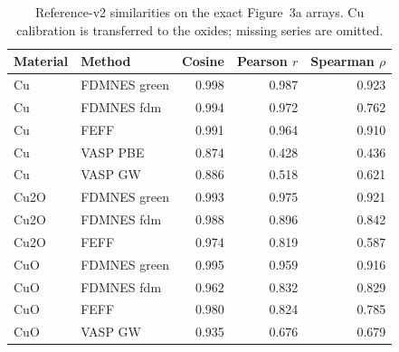 \begin{table}[htbp]\centering\small
\caption{Reference-v2 similarities on the exact Figure~3a arrays. Cu calibration is transferred to the oxides; missing series are omitted.}\label{tab:similarity}
\begin{tabular}{llrrr}\toprule Material & Method & Cosine & Pearson $r$ & Spearman $\rho$\\\midrule
Cu & FDMNES green & 0.998 & 0.987 & 0.923\\
Cu & FDMNES fdm & 0.994 & 0.972 & 0.762\\
Cu & FEFF & 0.991 & 0.964 & 0.910\\
Cu & VASP PBE & 0.874 & 0.428 & 0.436\\
Cu & VASP GW & 0.886 & 0.518 & 0.621\\
Cu2O & FDMNES green & 0.993 & 0.975 & 0.921\\
Cu2O & FDMNES fdm & 0.988 & 0.896 & 0.842\\
Cu2O & FEFF & 0.974 & 0.819 & 0.587\\
CuO & FDMNES green & 0.995 & 0.959 & 0.916\\
CuO & FDMNES fdm & 0.962 & 0.832 & 0.829\\
CuO & FEFF & 0.980 & 0.824 & 0.785\\
CuO & VASP GW & 0.935 & 0.676 & 0.679\\
\bottomrule\end{tabular}\end{table}
